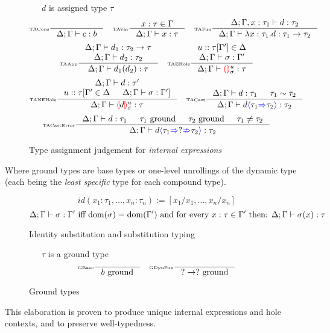 \begin{figure}[H]
\small
{}\ \ \ $d$ is assigned type $\tau$
\tiny
\[\inference[\tiny TACons]{}{\typeassignment{c}{b}}\quad
\inference[\tiny TAVar]{x : \tau \in \Gamma}{\typeassignment{x}{\tau}}\quad
\inference[\tiny TAFun]{\typeassignment[\Delta;\Gamma,x:\tau_1]{d}{\tau_2}}{\typeassignment{\lambda x:\tau_1. d}{\tau_1 \to \tau_2}}\]
\[\inference[\tiny TAApp]{\typeassignment{d_1}{\tau_2 \to \tau} \\ \typeassignment{d_2}{\tau_2}}{\typeassignment{d_1(d_2)}{\tau}} \quad 
\inference[\tiny TAEHole]{u :: \tau[\Gamma'] \in \Delta \\ \typeassignment{\sigma}{\Gamma'}}{\typeassignment{\hole^u_\sigma}{\tau}}\]
\[
\inference[\tiny TANEHole]{\typeassignment{d}{\tau'} \\ u :: \tau[\Gamma' \in \Delta & \typeassignment{\sigma}{\Gamma'}]}{\typeassignment{\hole[d]^u_\sigma}{\tau}}\quad 
\inference[\tiny TACast]{\typeassignment{d}{\tau_1} & \tau_1 \sim \tau_2}{\typeassignment{d\scast{\tau_1}{\tau_2}}{\tau_2}}\]
\[\inference[\tiny TACastError]{\typeassignment{d}{\tau_1} & \tau_1\text{ ground} & \tau_2\text{ ground} & \tau_1 \neq \tau_2}{\typeassignment{d\scasterror{\tau_1}{\tau_2}}{\tau_2}}\]
\caption{Type assignment judgement for \textit{internal expressions}}
\label{fig:typeassignment}
\end{figure}
Where ground types are base types or one-level unrollings of the dynamic type (each being the \textit{least specific} type for each compound type).

\begin{figure}
\tiny
\[id(x_1:\tau_1, \dots, x_n:\tau_n) := [x_1/x_1, \dots, x_n/x_n]\]
\[\Delta;\Gamma \vdash \sigma : \Gamma' \text{ iff } \mathrm{dom}(\sigma) = \mathrm{dom}(\Gamma')\text{ and for every } x : \tau \in \Gamma' \text{ then:
} \Delta;\Gamma \vdash \sigma(x) : \tau\]
\caption{Identity substitution and substitution typing}
\label{fig:substitutiontyping}
\end{figure}

\begin{figure}[h]
\tiny
{}\ \ \ $\tau$ is a ground type
\[\inference[\tiny GBase]{}{b\text{ ground}}\quad \inference[\tiny GDynFun]{}{? \to ?\text{ ground}}\]
\caption{Ground types}
\label{fig:groundtypes}
\end{figure}
This elaboration is proven to produce unique internal expressions and hole contexts, and to preserve well-typedness.


